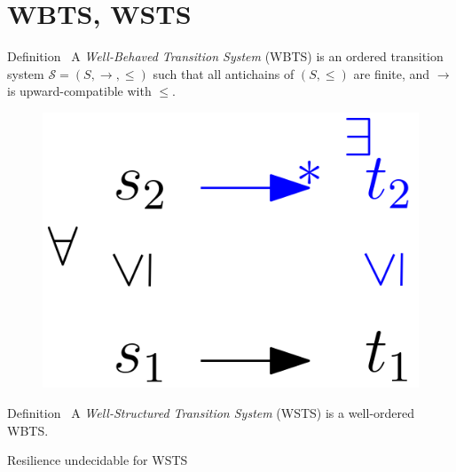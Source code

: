\documentclass{beamer}
\begin{document}
	\section{WBTS, WSTS}
  \begin{frame}{}
  
  \begin{block}{Definition~\cite{DBLP:journals/lmcs/BlondinFM17}}
A {\em Well-Behaved Transition System} (WBTS) 
is an ordered transition system $\mathscr{S}=(S, \rightarrow, \leq)$ such that   
all antichains of $(S, \leq)$ are finite, and
$ \rightarrow$ is upward-compatible with $\leq$. 
\end{block}

   \begin{center}
 	\begin{figure}
\includegraphics[width=.25\textwidth]{WSTS_def}
	\end{figure}
\end{center}  

\begin{block}{Definition~\cite{DBLP:journals/iandc/Finkel90}}
A {\em Well-Structured Transition System} (WSTS) 
is a well-ordered WBTS.
\end{block}


\pause


\begin{theorem}
{\sc Resilience} undecidable for WSTS
\end{theorem}








  \end{frame}
\end{document}
